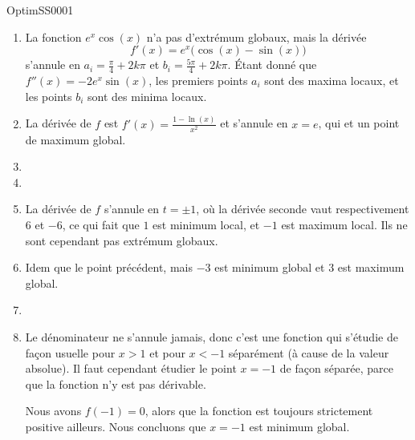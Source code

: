 
\begin{corrige}{OptimSS0001}

\begin{enumerate}

\item
La fonction $e^x\cos(x)$ n'a pas d'extrémum globaux, mais la dérivée
\begin{equation}
	f'(x)=e^x\big( \cos(x)-\sin(x) \big)
\end{equation}
s'annule en $a_i=\frac{ \pi }{ 4 }+2k\pi$ et $b_i=\frac{ 5\pi }{ 4 }+2k\pi$. Étant donné que $f''(x)=-2e^x\sin(x)$, les premiers points $a_i$ sont des maxima locaux, et les points $b_i$ sont des minima locaux.

\item
La dérivée de $f$ est $f'(x)=\frac{ 1-\ln(x) }{ x^2 }$ et s'annule en $x=e$, qui et un point de maximum global.
\item
\item
\item
La dérivée de $f$ s'annule en $t=\pm 1$, où la dérivée seconde vaut respectivement $6$ et $-6$, ce qui fait que $1$ est minimum local, et $-1$ est maximum local. Ils ne sont cependant pas extrémum globaux.

\item
Idem que le point précédent, mais $-3$ est minimum global et $3$ est maximum global.

\item
\item
Le dénominateur ne s'annule jamais, donc c'est une fonction qui s'étudie de façon usuelle pour $x>1$ et pour $x<-1$ séparément (à cause de la valeur absolue). Il faut cependant étudier le point $x=-1$ de façon séparée, parce que la fonction n'y est pas dérivable.

Nous avons $f(-1)=0$, alors que la fonction est toujours strictement positive ailleurs. Nous concluons que $x=-1$ est minimum global.
\end{enumerate}

\end{corrige}

